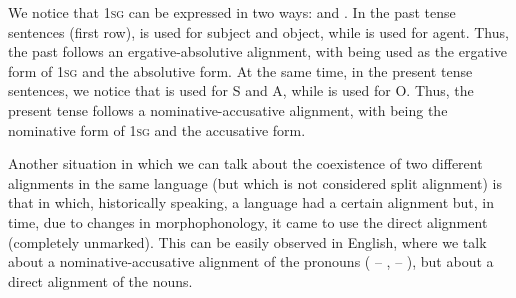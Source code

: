 \begin{refsection}
\begin{exe}
\begin{multicols}{3}
\end{multicols}
\end{exe}

We notice that 1\textsc{sg} can be expressed in two ways:  and . In the past tense sentences (first row),  is used for subject and object, while  is used for agent. Thus, the past follows an ergative-absolutive alignment, with  being used as the ergative form of 1\textsc{sg} and  the absolutive form. At the same time, in the present tense sentences, we notice that  is used for S and A, while  is used for O. Thus, the present tense follows a nominative-accusative alignment, with  being the nominative form of 1\textsc{sg} and  the accusative form.

Another situation in which we can talk about the coexistence of two different alignments in the same language (but which is not considered split alignment) is that in which, historically speaking, a language had a certain alignment but, in time, due to changes in morphophonology, it came to use the direct alignment (completely unmarked). This can be easily observed in English, where we talk about a nominative-accusative alignment of the pronouns ( -- ,  -- ), but about a direct alignment of the nouns.


\end{refsection}
